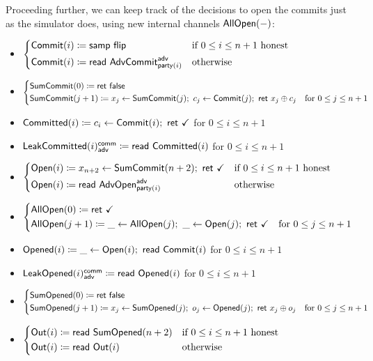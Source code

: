 \noindent Proceeding further, we can keep track of the decisions to open the commits just as the simulator does, using new internal channels $\mathsf{AllOpen}(-)$:

\begin{itemize}
\item {\color{blue} $\begin{cases*} \Commit(i) \coloneqq \samp{\flip} & \text{if $0 \leq i \leq n+1$ honest} \\ \Commit(i) \coloneqq \read{\AdvCommit^\adv_{\party(i)}} & \text{otherwise} \end{cases*}$}
\item {\color{blue} $\begin{cases*} \SumCommit(0) \coloneqq \ret{\false} & \\ \SumCommit(j+1) \coloneqq x_j \leftarrow \SumCommit(j); \ c_j \leftarrow \Commit(j); \ \ret{x_j \oplus c_j} & \text{for $0 \leq j \leq n+1$} \end{cases*}$}
\item {\color{magenta} $\mathsf{Committed}(i) \coloneqq c_i \leftarrow \mathsf{Commit}(i); \ \mathsf{ret} \ \checkmark$ for $0 \leq i \leq n+1$}
\item {\color{magenta} $\mathsf{LeakCommitted}(i)^{\mathsf{comm}}_{\mathsf{adv}} \coloneqq \mathsf{read} \ \mathsf{Committed}(i)$ for $0 \leq i \leq n+1$}
\item {\color{teal} $\begin{cases*} \Open(i) \coloneqq x_{n+2} \leftarrow \SumCommit(n+2); \ \ret{\checkmark} & \text{if $0 \leq i \leq n+1$ honest} \\ \Open(i) \coloneqq \read{\AdvOpen^\adv_{\party(i)}} & \text{otherwise} \end{cases*}$}
\item {\color{teal} $\begin{cases*} \AllOpen(0) \coloneqq \ret{\checkmark} & \\ \AllOpen(j+1) \coloneqq \_ \leftarrow \AllOpen(j); \ \_ \leftarrow \Open(j); \ \ret{\checkmark} & \text{for $0 \leq j \leq n+1$} \end{cases*}$}
\item {\color{red} $\mathsf{Opened}(i) \coloneqq \_ \leftarrow \mathsf{Open}(i); \ \mathsf{read} \ \mathsf{Commit}(i)$ for $0 \leq i \leq n+1$}
\item {\color{red} $\mathsf{LeakOpened}(i)^{\mathsf{comm}}_{\mathsf{adv}} \coloneqq \mathsf{read} \ \mathsf{Opened}(i)$ for $0 \leq i \leq n+1$}
\item {\color{red} $\begin{cases*} \SumOpened(0) \coloneqq \ret{\false} & \\ \SumOpened(j+1) \coloneqq x_j \leftarrow \SumOpened(j); \ o_j \leftarrow \Opened(j); \ \ret{x_j \oplus o_j} & \text{for $0 \leq j \leq n+1$} \end{cases*}$}
\item $\begin{cases*} \Out(i) \coloneqq \read{\SumOpened(n+2)} & \text{if $0 \leq i \leq n+1$ honest} \\ \Out(i) \coloneqq \read{\Out(i)} & \text{otherwise} \end{cases*}$
\end{itemize}

